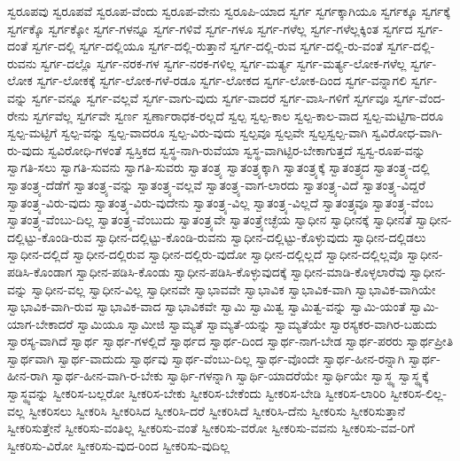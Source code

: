 {ಸ್ವರೂಪವು
ಸ್ವರೂಪವೆ
ಸ್ವರೂಪ-ವೆಂದು
ಸ್ವರೂಪ-ವೇನು
ಸ್ವರೂಪಿ-ಯಾದ
ಸ್ವರ್ಗ
ಸ್ವರ್ಗಕ್ಕಾಗಿಯೂ
ಸ್ವರ್ಗಕ್ಕೂ
ಸ್ವರ್ಗಕ್ಕೆ
ಸ್ವರ್ಗಕ್ಕೊ
ಸ್ವರ್ಗಕ್ಕೋ
ಸ್ವರ್ಗ-ಗಳನ್ನೂ
ಸ್ವರ್ಗ-ಗಳಿವೆ
ಸ್ವರ್ಗ-ಗಳೂ
ಸ್ವರ್ಗ-ಗಳೆಲ್ಲ
ಸ್ವರ್ಗ-ಗಳೆಲ್ಲಕ್ಕಿಂತ
ಸ್ವರ್ಗದ
ಸ್ವರ್ಗ-ದಂತೆ
ಸ್ವರ್ಗ-ದಲ್ಲಿ
ಸ್ವರ್ಗ-ದಲ್ಲಿಯೂ
ಸ್ವರ್ಗ-ದಲ್ಲಿ-ರುತ್ತಾನೆ
ಸ್ವರ್ಗ-ದಲ್ಲಿ-ರುವ
ಸ್ವರ್ಗ-ದಲ್ಲಿ-ರು-ವಂತೆ
ಸ್ವರ್ಗ-ದಲ್ಲಿ-ರುವನು
ಸ್ವರ್ಗ-ದಲ್ಲೊ
ಸ್ವರ್ಗ-ನರಕ-ಗಳ
ಸ್ವರ್ಗ-ನರಕ-ಗಳಿಲ್ಲ
ಸ್ವರ್ಗ-ಮರ್ತ್ಯ
ಸ್ವರ್ಗ-ಮರ್ತ್ಯ-ಲೋಕ-ಗಳೆಲ್ಲ
ಸ್ವರ್ಗ-ಲೋಕ
ಸ್ವರ್ಗ-ಲೋಕಕ್ಕೆ
ಸ್ವರ್ಗ-ಲೋಕ-ಗಳೆ-ರಡೂ
ಸ್ವರ್ಗ-ಲೋಕದ
ಸ್ವರ್ಗ-ಲೋಕ-ದಿಂದ
ಸ್ವರ್ಗ-ವನ್ನಾಗಲಿ
ಸ್ವರ್ಗ-ವನ್ನು
ಸ್ವರ್ಗ-ವನ್ನೂ
ಸ್ವರ್ಗ-ವಲ್ಲವೆ
ಸ್ವರ್ಗ-ವಾಗು-ವುದು
ಸ್ವರ್ಗ-ವಾದರೆ
ಸ್ವರ್ಗ-ವಾಸಿ-ಗಳಿಗೆ
ಸ್ವರ್ಗವೂ
ಸ್ವರ್ಗ-ವೆಂದ-ರೇನು
ಸ್ವರ್ಗವೆಲ್ಲ
ಸ್ವರ್ಗವೇ
ಸ್ವರ್ಣ
ಸ್ವರ್ಣಾರಾಧಕ-ರಲ್ಲದೆ
ಸ್ವಲ್ಪ
ಸ್ವಲ್ಪ-ಕಾಲ
ಸ್ವಲ್ಪ-ಕಾಲ-ವಾದ
ಸ್ವಲ್ಪ-ಮಟ್ಟಿಗಾ-ದರೂ
ಸ್ವಲ್ಪ-ಮಟ್ಟಿಗೆ
ಸ್ವಲ್ಪ-ವನ್ನು
ಸ್ವಲ್ಪ-ವಾದರೂ
ಸ್ವಲ್ಪ-ವಿರು-ವುದು
ಸ್ವಲ್ಪವೂ
ಸ್ವಲ್ಪವೇ
ಸ್ವಲ್ಪಸ್ವಲ್ಪ-ವಾಗಿ
ಸ್ವವಿರೋಧ-ವಾಗಿ-ರು-ವುದು
ಸ್ವವಿರೋಧಿ-ಗಳಂತೆ
ಸ್ವಸ್ತಿಕದ
ಸ್ವಸ್ಥ-ನಾಗಿ-ರುವೆಯಾ
ಸ್ವಸ್ಥ-ವಾಗಿಟ್ಟಿರ-ಬೇಕಾಗುತ್ತದೆ
ಸ್ವಸ್ವ-ರೂಪ-ವನ್ನು
ಸ್ವಾಗತಿ-ಸಲು
ಸ್ವಾಗತಿ-ಸುವನು
ಸ್ವಾಗತಿ-ಸುವರು
ಸ್ವಾತಂತ್ರ್ಯ
ಸ್ವಾತಂತ್ರ್ಯಕ್ಕಾಗಿ
ಸ್ವಾತಂತ್ರ್ಯಕ್ಕೆ
ಸ್ವಾತಂತ್ರ್ಯದ
ಸ್ವಾತಂತ್ರ್ಯ-ದಲ್ಲಿ
ಸ್ವಾತಂತ್ರ್ಯ-ದೆಡೆಗೆ
ಸ್ವಾತಂತ್ರ್ಯ-ವನ್ನು
ಸ್ವಾತಂತ್ರ್ಯ-ವಲ್ಲವೆ
ಸ್ವಾತಂತ್ರ್ಯ-ವಾಗ-ಲಾರದು
ಸ್ವಾತಂತ್ರ್ಯ-ವಿದೆ
ಸ್ವಾತಂತ್ರ್ಯ-ವಿದ್ದರೆ
ಸ್ವಾತಂತ್ರ್ಯ-ವಿರು-ವುದು
ಸ್ವಾತಂತ್ರ್ಯ-ವಿರು-ವುದೇನು
ಸ್ವಾತಂತ್ರ್ಯ-ವಿಲ್ಲ
ಸ್ವಾತಂತ್ರ್ಯ-ವಿಲ್ಲದೆ
ಸ್ವಾತಂತ್ರ್ಯವೂ
ಸ್ವಾತಂತ್ರ್ಯ-ವೆಂಬ
ಸ್ವಾತಂತ್ರ್ಯ-ವೆಂಬು-ದಿಲ್ಲ
ಸ್ವಾತಂತ್ರ್ಯ-ವೆಂಬುದು
ಸ್ವಾತಂತ್ರ್ಯವೇ
ಸ್ವಾತಂತ್ರ್ಯೇಚ್ಛೆಯ
ಸ್ವಾಧೀನ
ಸ್ವಾಧೀನಕ್ಕೆ
ಸ್ವಾಧೀನತೆ
ಸ್ವಾಧೀನ-ದಲ್ಲಿಟ್ಟು-ಕೊಂಡಿ-ರುವ
ಸ್ವಾಧೀನ-ದಲ್ಲಿಟ್ಟು-ಕೊಂಡಿ-ರುವನು
ಸ್ವಾಧೀನ-ದಲ್ಲಿಟ್ಟು-ಕೊಳ್ಳುವುದು
ಸ್ವಾಧೀನ-ದಲ್ಲಿಡಲು
ಸ್ವಾಧೀನ-ದಲ್ಲಿದೆ
ಸ್ವಾಧೀನ-ದಲ್ಲಿರುವ
ಸ್ವಾಧೀನ-ದಲ್ಲಿರು-ವುದೋ
ಸ್ವಾಧೀನ-ದಲ್ಲಿಲ್ಲದೆ
ಸ್ವಾಧೀನ-ದಲ್ಲಿಲ್ಲವೊ
ಸ್ವಾಧೀನ-ಪಡಿಸಿ-ಕೊಂಡಾಗ
ಸ್ವಾಧೀನ-ಪಡಿಸಿ-ಕೊಂಡು
ಸ್ವಾಧೀನ-ಪಡಿಸಿ-ಕೊಳ್ಳುವುದಕ್ಕೆ
ಸ್ವಾಧೀನ-ಮಾಡಿ-ಕೊಳ್ಳಲಾರೆವು
ಸ್ವಾಧೀನ-ವನ್ನು
ಸ್ವಾಧೀನ-ವಲ್ಲ
ಸ್ವಾಧೀನ-ವಿಲ್ಲ
ಸ್ವಾಧೀನವೇ
ಸ್ವಾಭಾವವೇ
ಸ್ವಾಭಾವಿಕ
ಸ್ವಾಭಾವಿಕ-ವಾಗಿ
ಸ್ವಾಭಾವಿಕ-ವಾಗಿಯೇ
ಸ್ವಾಭಾವಿಕ-ವಾಗಿ-ರುವ
ಸ್ವಾಭಾವಿಕ-ವಾದ
ಸ್ವಾಭಾವಿಕವೇ
ಸ್ವಾಮಿ
ಸ್ವಾಮಿತ್ವ
ಸ್ವಾಮಿತ್ವ-ವನ್ನು
ಸ್ವಾಮಿ-ಯಂತೆ
ಸ್ವಾಮಿ-ಯಾಗ-ಬೇಕಾದರೆ
ಸ್ವಾಮಿಯೂ
ಸ್ವಾಮೀಜಿ
ಸ್ವಾಮ್ಯತೆ
ಸ್ವಾಮ್ಯತೆ-ಯನ್ನು
ಸ್ವಾಮ್ಯತೆಯೇ
ಸ್ವಾರಸ್ಯಕರ-ವಾಗಿರ-ಬಹುದು
ಸ್ವಾರಸ್ಯ-ವಾಗಿದೆ
ಸ್ವಾರ್ಥ
ಸ್ವಾರ್ಥ-ಗಳಲ್ಲಿದೆ
ಸ್ವಾರ್ಥದ
ಸ್ವಾರ್ಥ-ದಿಂದ
ಸ್ವಾರ್ಥ-ನಾಗ-ಬೇಡ
ಸ್ವಾರ್ಥ-ಪರರು
ಸ್ವಾರ್ಥಪ್ರೀತಿ
ಸ್ವಾರ್ಥವಾಗಿ
ಸ್ವಾರ್ಥ-ವಾದುದು
ಸ್ವಾರ್ಥವು
ಸ್ವಾರ್ಥ-ವೆಂಬು-ದಿಲ್ಲ
ಸ್ವಾರ್ಥ-ವೊಂದೇ
ಸ್ವಾರ್ಥ-ಹೀನ-ರನ್ನಾಗಿ
ಸ್ವಾರ್ಥ-ಹೀನ-ರಾಗಿ
ಸ್ವಾರ್ಥ-ಹೀನ-ವಾಗಿ-ರ-ಬೇಕು
ಸ್ವಾರ್ಥಿ-ಗಳನ್ನಾಗಿ
ಸ್ವಾರ್ಥಿ-ಯಾದರೆಯೇ
ಸ್ವಾರ್ಥಿಯೇ
ಸ್ವಾಸ್ಥ್ಯ
ಸ್ವಾಸ್ಥ್ಯಕ್ಕೆ
ಸ್ವಾಸ್ಥ್ಯವನ್ನು
ಸ್ವೀಕರಿಸ-ಬಲ್ಲರೋ
ಸ್ವೀಕರಿಸ-ಬೇಕು
ಸ್ವೀಕರಿಸ-ಬೇಕೆಂದು
ಸ್ವೀಕರಿಸ-ಬೇಡಿ
ಸ್ವೀಕರಿಸ-ಲಾರಿರಿ
ಸ್ವೀಕರಿಸ-ಲಿಲ್ಲ-ವಲ್ಲ
ಸ್ವೀಕರಿಸಲು
ಸ್ವೀಕರಿಸಿ
ಸ್ವೀಕರಿಸಿದ
ಸ್ವೀಕರಿಸಿ-ದರೆ
ಸ್ವೀಕರಿಸಿದೆ
ಸ್ವೀಕರಿಸಿ-ದೆನು
ಸ್ವೀಕರಿಸು
ಸ್ವೀಕರಿಸುತ್ತಾನೆ
ಸ್ವೀಕರಿಸುತ್ತೇನೆ
ಸ್ವೀಕರಿಸು-ವಂತಿಲ್ಲ
ಸ್ವೀಕರಿಸು-ವಂತೆ
ಸ್ವೀಕರಿಸು-ವರೋ
ಸ್ವೀಕರಿಸು-ವವನು
ಸ್ವೀಕರಿಸು-ವವ-ರಿಗೆ
ಸ್ವೀಕರಿಸು-ವಿರೋ
ಸ್ವೀಕರಿಸು-ವುದ-ರಿಂದ
ಸ್ವೀಕರಿಸು-ವುದಿಲ್ಲ
}
